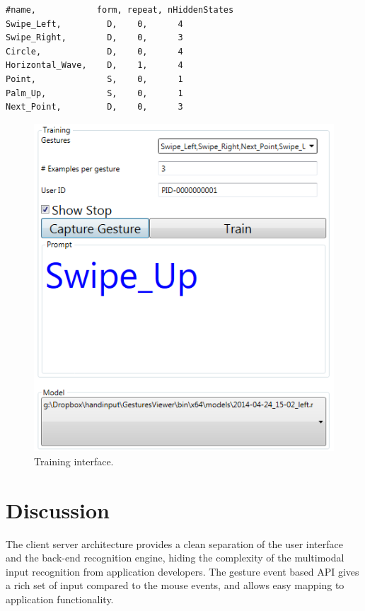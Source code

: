 \begin{lstlisting}[caption={Gesture definition file.},
label={lst:gesture-def}] 
#name,            form, repeat, nHiddenStates
Swipe_Left,         D,    0,      4
Swipe_Right,        D,    0,      3
Circle,             D,    0,      4
Horizontal_Wave,    D,    1,      4
Point,              S,    0,      1
Palm_Up,            S,    0,      1
Next_Point,         D,    0,      3
\end{lstlisting}

\begin{figure}[tbh]
\centering
\includegraphics[width=0.5\columnwidth]{figures/training_interface.PNG}
\caption{Training interface.}
\label{fig:training}
\end{figure}

\section{Discussion}
The client server architecture provides a clean separation of the user
interface and the back-end recognition engine, hiding the complexity of the
multimodal input recognition from application developers. The gesture event
based API gives a rich set of input compared to the mouse events, and allows
easy mapping to application functionality.


